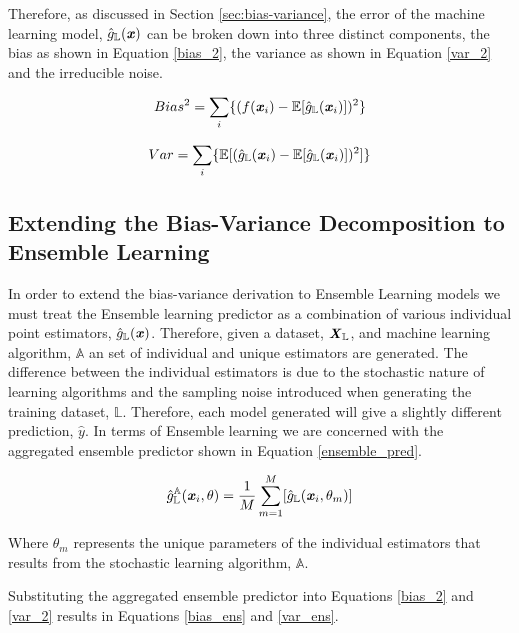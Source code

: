 \documentclass[../SMLreport_template.tex]{subfiles}
\begin{document}
Therefore, as discussed in Section \ref{sec:bias-variance}, the error of the machine learning model,  \(\hat{g}_\mathbb{L}(\textbf{\textit{x}})\) can be broken down into three distinct  components, the bias as shown in Equation \ref{bias_2}, the variance as shown in Equation \ref{var_2} and the irreducible noise.   

\begin{equation} \label{bias_2}
Bias^2 = \sum_{i}\{(f(\textbf{\textit{x}}_i)-\mathbb{E}[\hat{g}_\mathbb{L}(\textbf{\textit{x}}_i)])^2\}
\end{equation}

\begin{equation} \label{var_2}
Var = \sum_{i}\{\mathbb{E}[(\hat{g}_\mathbb{L}(\textbf{\textit{x}}_i)-\mathbb{E}[\hat{g}_\mathbb{L}(\textbf{\textit{x}}_i)])^2]\}
\end{equation}

\subsection{Extending the Bias-Variance Decomposition to Ensemble Learning}
In order to extend the bias-variance derivation to Ensemble Learning models we must treat the Ensemble learning predictor as a combination of various individual point estimators, \(\hat{g}_\mathbb{L}(\textbf{\textit{x}})\). Therefore, given a dataset, \(\textbf{\textit{X}}_\mathbb{L}\), and machine learning algorithm, \(\mathbb{A}\) an set of individual and unique estimators are generated. The difference between the individual estimators is due to the stochastic nature of learning algorithms and the sampling noise introduced when generating the training dataset, \(\mathbb{L}\). Therefore, each model generated will give a slightly different prediction, \(\hat{y}\). In terms of Ensemble learning we are concerned with the aggregated ensemble predictor shown in Equation \ref{ensemble_pred}.

\begin{equation}\label{ensemble_pred}
    \hat{g}_\mathbb{L}^\mathbb{A}(\textbf{\textit{x}}_i, \theta) = \frac{1}{M}\sum_{m=1}^{M}[\hat{g}_\mathbb{L}(\textbf{\textit{x}}_i, \theta_m)]
\end{equation}

Where \(\theta_m\) represents the unique parameters of the individual estimators that results from the stochastic learning algorithm, \(\mathbb{A}\).

Substituting the aggregated ensemble predictor into Equations \ref{bias_2} and \ref{var_2} results in Equations \ref{bias_ens} and \ref{var_ens}.
\end{document}
